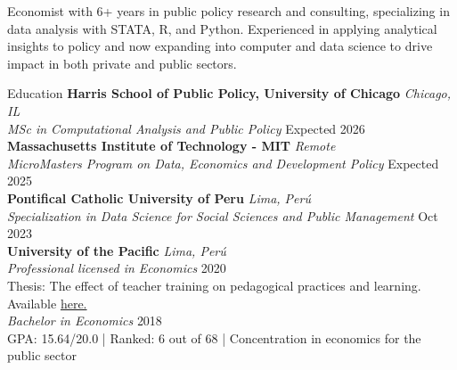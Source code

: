 \documentclass{resume} %
\begin{document}
    \vspace{5pt}
    \item{Economist with 6+ years in public policy research and consulting, specializing in data analysis with STATA, R, and Python. Experienced in applying analytical insights to policy and now expanding into computer and data science to drive impact in both private and public sectors.}

\begin{rSection}{Education}
    {\bf Harris School of Public Policy, University of Chicago} \hfill \textit{Chicago, IL} \\
    \textit{MSc in Computational Analysis and Public Policy} \hfill {Expected 2026} \\

    \vspace{-15pt} %
    {\bf Massachusetts Institute of Technology - MIT} \hfill \textit{Remote} \\
    \textit{MicroMasters Program on Data, Economics and Development Policy} \hfill {Expected 2025}\\

    \vspace{-15pt} %
    {\bf Pontifical Catholic University of Peru} \hfill \textit{Lima, Perú} \\
    \textit{Specialization in Data Science for Social Sciences and Public Management} \hfill {Oct 2023}\\

    \vspace{-15pt} %
    {\bf University of the Pacific} \hfill \textit{Lima, Perú} \\
    \textit{Professional licensed in Economics} \hfill {2020} \\
    Thesis: The effect of teacher training on pedagogical practices and learning. Available \href{https://repositorio.up.edu.pe/handle/11354/2653}{here.} \\

    \vspace{-15pt} %
    \textit{Bachelor in Economics} \hfill {2018} \\
    GPA: 15.64/20.0 | Ranked: 6 out of 68 | Concentration in economics for the public sector

\end{rSection}
\end{document}
